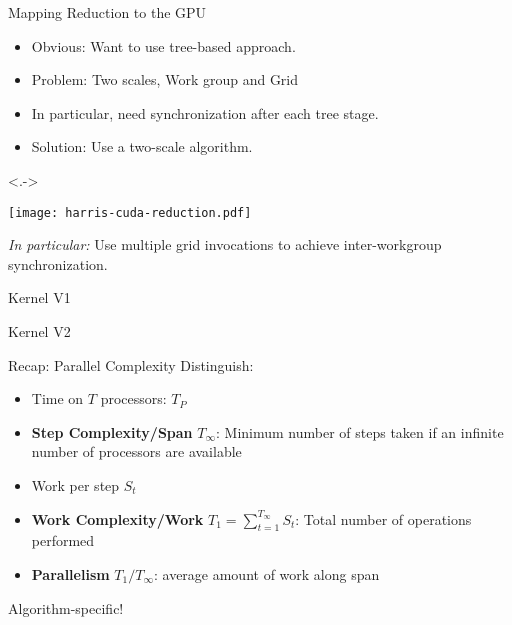 \documentclass[english,compress]{beamer}
\begin{document}
\begin{frame}{Mapping Reduction to the GPU}
  \begin{itemize}
    \item<+-> Obvious: Want to use tree-based approach.
    \item Problem: Two scales, Work group and Grid
    \item In particular, need synchronization after each tree stage.
    \item<+-> Solution: Use a two-scale algorithm.
  \end{itemize}
  \uncover<.->{
  \texttt{[image: harris-cuda-reduction.pdf]}

  \emph{In particular:} Use multiple grid invocations to achieve
  inter-workgroup synchronization.
  }
  \harriscredit
\end{frame}
\begin{frame}{Kernel V1}
  
\end{frame}
\begin{frame}{Kernel V2}
  
\end{frame}
\begin{frame}{Recap: Parallel Complexity}
  Distinguish:
  \begin{itemize}
    \item Time on $T$ processors: $T_P$
    \item \textbf{Step Complexity/Span} $T_\infty$: Minimum number of steps taken if
    an infinite number of processors are available
    \item Work per step $S_t$
    \item \textbf{Work Complexity/Work} $T_1=\sum_{t=1}^{T_\infty} S_t$: Total number of operations performed
    \item \textbf{Parallelism} $T_1/T_\infty$: average amount of work
    along span
  \end{itemize}
  Algorithm-specific!
\end{frame}
\end{document}
